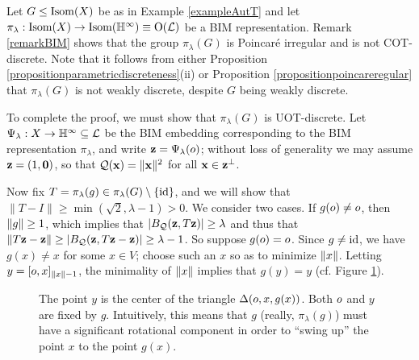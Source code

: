 \begin{example}
\label{exampleAutTBIM}
Let $G\leq\operatorname{Isom}(X)$ be as in Example \ref{exampleAutT} and let $\pi_\lambda:\Isom(X)\to \Isom(\H^\infty) \equiv \O(\LL)$ be a BIM representation. Remark \ref{remarkBIM} shows that the group $\pi_\lambda(G)$ is Poincar\'e irregular and is not COT-discrete. Note that it follows from either Proposition \ref{propositionparametricdiscreteness}(ii) or Proposition \ref{propositionpoincareregular} that $\pi_\lambda(G)$ is not weakly discrete, despite $G$ being weakly discrete.

To complete the proof, we must show that $\pi_\lambda(G)$ is UOT-discrete. Let $\Psi_\lambda:X\to\H^\infty\subset\LL$ be the BIM embedding corresponding to the BIM representation $\pi_\lambda$, and write $\mathbf z = \Psi_\lambda(o)$; without loss of generality we may assume $\mathbf z = (1,\mathbf 0)$, so that $\mathcal Q(\mathbf x) = \|\mathbf x\|^2$ for all $\mathbf x\in\mathbf z^\perp$.

Now fix $T = \pi_\lambda(g)\in \pi_\lambda(G)\setminus\{\mathrm{id}\}$, and we will show that $\|T - I\|\geq \min(\sqrt 2,\lambda - 1) > 0$. We consider two cases. If $g(o)\neq o$, then $\|g\|\geq 1$, which implies that $|B_\mathcal Q(\mathbf z,T\mathbf z)| \geq \lambda$ and thus that $\|T\mathbf z - \mathbf z\| \geq |B_\mathcal Q(\mathbf z,T\mathbf z - \mathbf z)| \geq \lambda - 1$. So suppose $g(o) = o$. Since $g\neq\mathrm{id}$, we have $g(x) \neq x$ for some $x\in V$; choose such an $x$ so as to minimize $\|x\|$. Letting $y = [o,x]_{\|x\| - 1}$, the minimality of $\|x\|$ implies that $g(y) = y$ (cf. Figure \ref{figureexampleAutTBIM}).

\begin{figure}
\begin{center}
\caption[Geometry of automorphisms of a simplicial tree]{The point $y$ is the center of the triangle $\Delta(o,x,g(x))$. Both $o$ and $y$ are fixed by $g$. Intuitively, this means that $g$ (really, $\pi_\lambda(g)$) must have a significant rotational component in order to ``swing up'' the point $x$ to the point $g(x)$.}
\label{figureexampleAutTBIM}
\end{center}
\end{figure}



\end{example}
